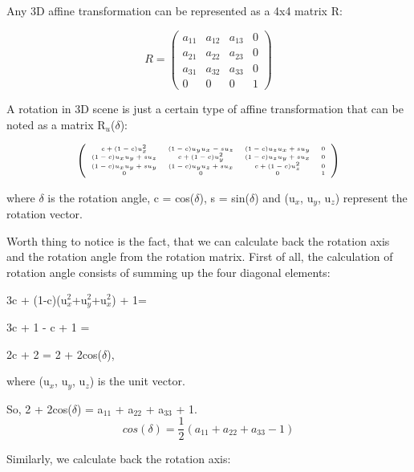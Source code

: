 \documentclass[times, 10pt,twocolumn]{article}
\begin{document}
Any 3D affine transformation can be represented as a 4x4 matrix R:

\[ R = \left( \begin{array}{cccc}
a_{11} & a_{12} & a_{13} & 0 \\
a_{21} & a_{22} & a_{23} & 0 \\
a_{31} & a_{32} & a_{33} & 0 \\
0 & 0 & 0 & 1
\end{array} \right)\]

A rotation in 3D scene is just a certain type of affine transformation that can be noted as a matrix R$_{u}$($\delta$):

\[ \left( \begin{tiny}\begin{array}{cccc}
c+(1-c)u_{x}^{2} & (1-c)u_{y}u_{x}-su_{z} & (1-c)u_{z}u_{x}+su_{y} & 0 \\
(1-c)u_{x}u_{y}+su_{z} & c+(1-c)u_{y}^{2} & (1-c)u_{z}u_{y}+su_{x} & 0 \\
(1-c)u_{x}u_{y}+su_{y} & (1-c)u_{y}u_{z}+su_{x} & c+(1-c)u_{z}^{2} & 0 \\
0 & 0 & 0 & 1
\end{array}\end{tiny} \right)\]

where $\delta$ is the rotation angle, c = cos($\delta$), s = sin($\delta$) and (u$_{x}$, u$_{y}$, u$_{z}$) represent the rotation vector.

Worth thing to notice is the fact, that we can calculate back the rotation axis and the rotation angle from the rotation matrix. First of all, the calculation of rotation angle consists of summing up the four diagonal elements:
\begin{description}
    \setlength{\itemsep}{0pt}

    \item 3c + (1-c)(u$_{x}^{2}$+u$_{y}^2$+u$_{x}^{2}$) + 1=
    \item 3c + 1 - c + 1 =
    \item 2c + 2 = 2 + 2cos($\delta$),
\end{description}
where (u$_{x}$, u$_{y}$, u$_{z}$) is the unit vector.

So, 2 + 2cos($\delta$) = a$_{11}$ + a$_{22}$  + a$_{33}$ + 1.
\begin{equation}
\label{eq_cosdelta}
cos(\delta) = \frac{1}{2}(a_{11} + a_{22}  + a_{33} - 1)
\end{equation}

Similarly, we calculate back the rotation axis:
\end{document}
